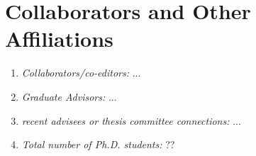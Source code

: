 \documentclass[11pt]{article}
\begin{document}
\section{Collaborators and Other Affiliations}

\begin{enumerate}
\item \textit{Collaborators/co-editors:}
  ...
\item \textit{Graduate Advisors:} 
  ...
\item \textit{recent advisees or thesis committee connections:}
  ...
\item \textit{Total number of Ph.D. students:} ??
\end{enumerate}
\end{document}
